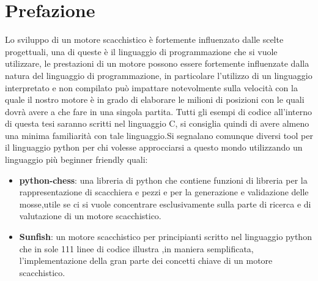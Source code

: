 \section{Prefazione} %
Lo sviluppo di un motore scacchistico è fortemente influenzato dalle scelte progettuali,
una di queste è il linguaggio di programmazione che si vuole utilizzare,
le prestazioni di un motore possono essere fortemente influenzate dalla natura del linguaggio di
programmazione, in particolare l'utilizzo di un linguaggio interpretato e non compilato può impattare
notevolmente sulla velocità con la quale il nostro motore è in grado di elaborare le milioni di
posizioni con le quali dovrà avere a che fare in una singola partita.
Tutti gli esempi di codice all'interno di questa tesi saranno scritti nel linguaggio C, si consiglia
quindi di avere almeno una minima familiarità con tale linguaggio.Si segnalano comunque diversi
tool  per il linguaggio python per chi volesse approcciarsi a questo mondo utilizzando un
linguaggio più beginner friendly  quali:
\begin{itemize}
    \item \textbf{python-chess}: una libreria di python che contiene funzioni di libreria per la rappresentazione
          di scacchiera e pezzi e per la generazione e validazione delle mosse,utile se ci si vuole concentrare
          esclusivamente sulla parte di ricerca e di valutazione  di un motore scacchistico.
    \item \textbf{Sunfish}: un motore scacchistico per principianti scritto nel linguaggio python che
          in sole 111 linee di codice illustra ,in maniera semplificata, l'implementazione della
          gran parte dei concetti  chiave di un motore scacchistico.

\end{itemize}



